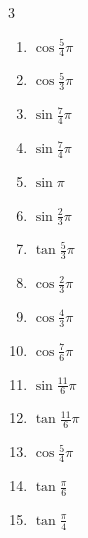 \begin{multicols}{3}
\begin{enumerate}
  \item $\displaystyle \cos{\frac{5}{4}\pi}$

  \item $\displaystyle \cos{\frac{5}{3}\pi}$

  \item $\displaystyle \sin{\frac{7}{4}\pi}$

  \item $\displaystyle \sin{\frac{7}{4}\pi}$

  \item $\displaystyle \sin{\pi}$
        \phantom{$\displaystyle =0$}

  \item $\displaystyle \sin{\frac{2}{3}\pi}$

  \item $\displaystyle \tan{\frac{5}{3}\pi}$

  \item $\displaystyle \cos{\frac{2}{3}\pi}$

  \item $\displaystyle \cos{\frac{4}{3}\pi}$

  \item $\displaystyle \cos{\frac{7}{6}\pi}$

\columnbreak %

  \item $\displaystyle \sin{\frac{11}{6}\pi}$

  \item $\displaystyle \tan{\frac{11}{6}\pi}$

  \item $\displaystyle \cos{\frac{5}{4}\pi}$

  \item $\displaystyle \tan{\frac{\pi}{6}}$

  \item $\displaystyle \tan{\frac{\pi}{4}}$
        \phantom{$\displaystyle =1$}


\end{enumerate}
\end{multicols}
